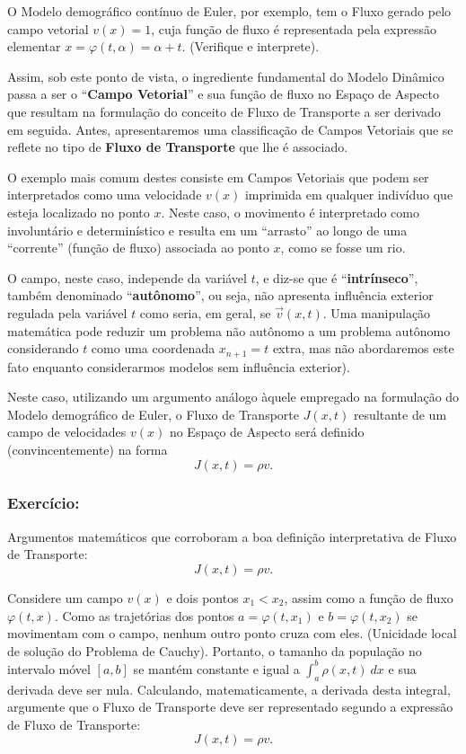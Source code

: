O Modelo demográfico contínuo de Euler, por exemplo, tem o Fluxo gerado pelo campo vetorial \(v(x) = 1\), cuja função de fluxo é representada pela expressão elementar \(x = \varphi(t, \alpha) = \alpha+t\). (Verifique e interprete).

Assim, sob este ponto de vista, o ingrediente fundamental do Modelo Dinâmico passa a ser o ``\textbf{Campo Vetorial}'' e sua função de fluxo no Espaço de Aspecto que resultam na formulação do conceito de Fluxo de Transporte a ser derivado em seguida. Antes, apresentaremos uma classificação de Campos Vetoriais que se reflete no tipo de \textbf{Fluxo de Transporte} que lhe é associado.

O exemplo mais comum destes consiste em Campos Vetoriais que podem ser interpretados como uma velocidade \(v(x)\) imprimida em qualquer indivíduo que esteja localizado no ponto \(x\). Neste caso, o movimento é interpretado como involuntário e determinístico e resulta em um ``arrasto'' ao longo de uma ``corrente'' (função de fluxo) associada ao ponto \(x\), como se fosse um rio.

O campo, neste caso, independe da variável \(t\), e diz-se que é ``\textbf{intrínseco}'', também denominado ``\textbf{autônomo}'', ou seja, não apresenta influência exterior regulada pela variável \(t\) como seria, em geral, se \(\vec{v}(x,t)\). Uma manipulação matemática pode reduzir um problema não autônomo a um problema autônomo considerando \(t\) como uma coordenada \(x_{n+1} = t\) extra, mas não abordaremos este fato enquanto considerarmos modelos sem influência exterior).

Neste caso, utilizando um argumento análogo àquele empregado na formulação do Modelo demográfico de Euler, o Fluxo de Transporte \(J(x,t)\) resultante de um campo de velocidades \(v(x)\) no Espaço de Aspecto será definido (convincentemente) na forma
\[J(x,t) = \rho v.\]

{\small\color{blue}
\subsubsection*{Exercício:}

Argumentos matemáticos que corroboram a boa definição interpretativa de Fluxo de Transporte:
\[J(x,t) = \rho v.\]

\begin{exercise}
Considere um campo \(v(x)\) e dois pontos \(x_1 < x_2\), assim como a função de fluxo \(\varphi(t, x)\). Como as trajetórias dos pontos \(a = \varphi(t, x_1)\) e \(b = \varphi(t, x_2)\) se movimentam com o campo, nenhum outro ponto cruza com eles. (Unicidade local de solução do Problema de Cauchy). Portanto, o tamanho da população no intervalo móvel \([a, b]\) se mantém constante e igual a \(\displaystyle\int_{a}^{b} \rho(x,t)\ dx\) e sua derivada deve ser nula. Calculando, matematicamente, a derivada desta integral, argumente que o Fluxo de Transporte deve ser representado segundo a expressão de Fluxo de Transporte:
\[J(x,t) = \rho v.\]
\end{exercise}
}



